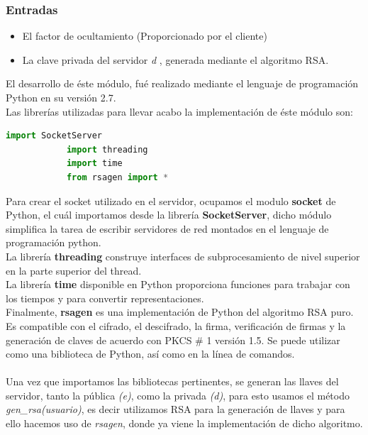 \subsubsection{Entradas}
\begin{itemize}
	\item El factor de ocultamiento (Proporcionado por el cliente)
	\item La clave privada del servidor \textit{d} , generada mediante el algoritmo RSA. 
\end{itemize}

El desarrollo de éste módulo, fué realizado mediante el lenguaje de programación Python en su versión 2.7. \\
Las librerías utilizadas para llevar acabo la implementación de éste módulo son: 

\begin{lstlisting}[language=Python,frame=single, keywordstyle=\color{blue},showstringspaces=false]
			import SocketServer
			import threading
			import time
			from rsagen import *
\end{lstlisting}

Para crear el socket utilizado en el servidor, ocupamos el modulo \textbf{socket} de Python, el cuál importamos desde la librería \textbf{SocketServer}, dicho módulo simplifica la tarea de escribir servidores de red montados en el lenguaje de programación python. \\ La librería \textbf{threading} construye interfaces de subprocesamiento de nivel superior en la parte superior del thread.\\
La librería \textbf{time} disponible en Python proporciona funciones para trabajar con los tiempos y para convertir representaciones.\\
Finalmente,\textbf{ rsagen} es una implementación de Python del algoritmo RSA puro. Es compatible con el cifrado,  el descifrado, la firma, verificación de firmas y la generación de claves de acuerdo con PKCS \# 1 versión 1.5. Se puede utilizar como una biblioteca de Python, así como en la línea de comandos.
\\ \\ 

Una vez que importamos las bibliotecas pertinentes, se generan las llaves del servidor, tanto la pública \textit{(e)}, como la privada \textit{(d)}, para esto usamos el método \textit{gen\_rsa(usuario)}, es decir utilizamos RSA para la generación de llaves y para ello hacemos uso de \textit{rsagen}, donde ya viene la implementación de dicho algoritmo. \\ 

